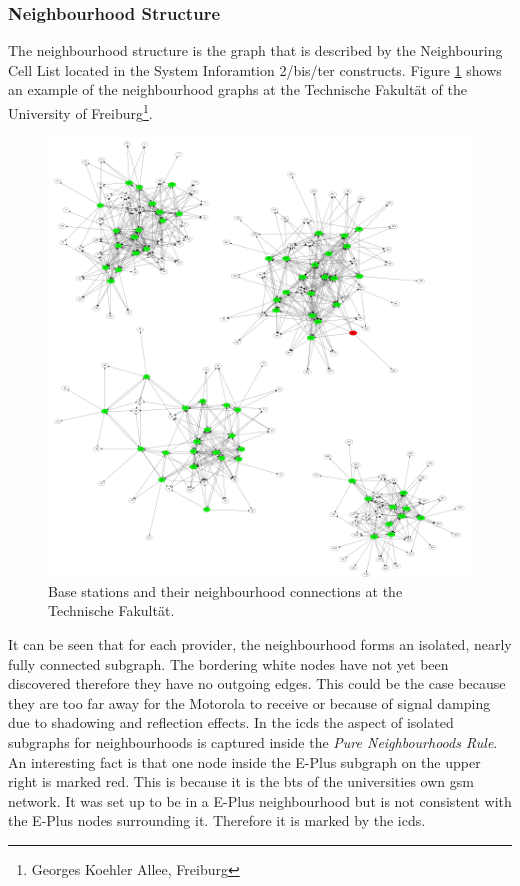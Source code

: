 \subsubsection{Neighbourhood Structure}
The neighbourhood structure is the graph that is described by the Neighbouring Cell List located in the System Inforamtion 2/bis/ter constructs.
Figure \ref{fig:neighbourhood_example} shows an example of the neighbourhood graphs at the Technische Fakult\"at of the University of Freiburg\footnote{Georges Koehler Allee, Freiburg}.
\begin{figure}
\centering
\includegraphics[width=.9\textwidth]{../Images/neighbourhoods_fak}
\caption{Base stations and their neighbourhood connections at the Technische Fakult\"at.}
\label{fig:neighbourhood_example}
\end{figure}
It can be seen that for each provider, the neighbourhood forms an isolated, nearly fully connected subgraph.
The bordering white nodes have not yet been discovered therefore they have no outgoing edges.
This could be the case because they are too far away for the Motorola to receive or because of signal damping due to shadowing and reflection effects.
In the \gls{icds} the aspect of isolated subgraphs for neighbourhoods is captured inside the \emph{Pure Neighbourhoods Rule}.
An interesting fact is that one node inside the E-Plus subgraph on the upper right is marked red.
This is because it is the \gls{bts} of the universities own \gls{gsm} network.
It was set up to be in a E-Plus neighbourhood but is not consistent with the E-Plus nodes surrounding it.
Therefore it is marked by the \gls{icds}.

